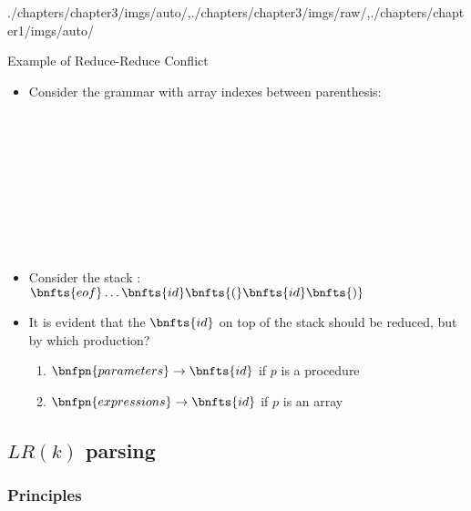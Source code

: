 \begin{graphicspathcontext}{{./chapters/chapter3/imgs/auto/},{./chapters/chapter3/imgs/raw/},{./chapters/chapter1/imgs/auto/}}
\begin{bibunit}[apalike]
\begin{frame}[t]{Example of Reduce-Reduce Conflict}	
	\begin{itemize}
	\item Consider the grammar with array indexes between parenthesis:
		\begin{footnotesize}\begin{bnf}
			 \\
			 \\
			 \\
			 \\
			 \\
			 \\
			 \\
			 \\
		\end{bnf}\end{footnotesize}
	\vspace{-.75cm}
	\item Consider the stack : $\bnfts{eof} \dots \bnfts{id} \bnfts{(} \bnfts{id} \bnfts{)}$
	\item It is evident that the $\bnfts{id}$ on top of the stack should be reduced, but by which production?
		\begin{enumerate}
		\item $\bnfpn{parameters} \bnfopo \bnfts{id}$ if $p$ is a procedure
		\item $\bnfpn{expressions} \bnfopo \bnfts{id}$ if $p$ is an array
		\end{enumerate}
	\end{itemize}
\end{frame}

\subsection{$LR(k)$ parsing}
\subsectiontableofcontentslide*

\subsubsection{Principles}


\end{bibunit}
\end{graphicspathcontext}
